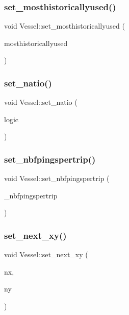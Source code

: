 \subsubsection{\texorpdfstring{set\_mosthistoricallyused()}{set\_mosthistoricallyused()}}
{\footnotesize\ttfamily void Vessel\+::set\+\_\+mosthistoricallyused (\begin{DoxyParamCaption}\item[{\mbox{\hyperlink{classtypes_1_1_node_id}{types\+::\+Node\+Id}}}]{mosthistoricallyused }\end{DoxyParamCaption})}

\mbox{\label{class_vessel_ae59eb882f03a8833fc73d1afb7eade82}} 
\subsubsection{\texorpdfstring{set\_natio()}{set\_natio()}}
{\footnotesize\ttfamily void Vessel\+::set\+\_\+natio (\begin{DoxyParamCaption}\item[{bool}]{logic }\end{DoxyParamCaption})}

\mbox{\label{class_vessel_a93497f7d218b968b2c5eace1f8732a2c}} 
\subsubsection{\texorpdfstring{set\_nbfpingspertrip()}{set\_nbfpingspertrip()}}
{\footnotesize\ttfamily void Vessel\+::set\+\_\+nbfpingspertrip (\begin{DoxyParamCaption}\item[{int}]{\+\_\+nbfpingspertrip }\end{DoxyParamCaption})}

\mbox{\label{class_vessel_ac7f46469511134a11fd75865d15cfcf1}} 
\subsubsection{\texorpdfstring{set\_next\_xy()}{set\_next\_xy()}}
{\footnotesize\ttfamily void Vessel\+::set\+\_\+next\+\_\+xy (\begin{DoxyParamCaption}\item[{double}]{nx,  }\item[{double}]{ny }\end{DoxyParamCaption})}

